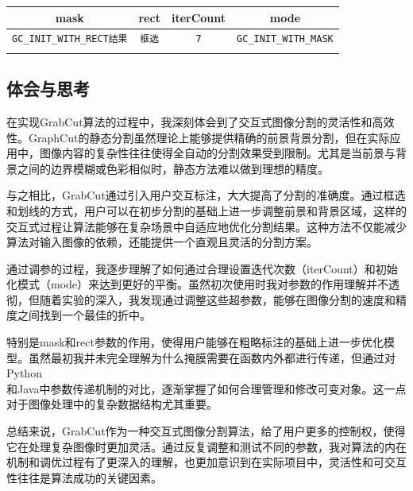 \documentclass[UTF8]{ctexart}
\begin{document}
\begin{table}[htbp]
\centering
\begin{tabular}{cccc}
\toprule[1.5pt]
\textbf{mask} & \textbf{rect} & \textbf{iterCount} & \textbf{mode}\\
\midrule
\verb|GC_INIT_WITH_RECT结果| & \verb|框选| & \verb|7| & \verb|GC_INIT_WITH_MASK|\\
\bottomrule[1.5pt]
\label{tab:params}
\end{tabular}
\end{table}

\subsection{体会与思考}
在实现GrabCut算法的过程中，我深刻体会到了交互式图像分割的灵活性和高效性。GraphCut的静态分割虽然理论上能够提供精确的前景背景分割，但在实际应用中，图像内容的复杂性往往使得全自动的分割效果受到限制。尤其是当前景与背景之间的边界模糊或色彩相似时，静态方法难以做到理想的精度。\par
与之相比，GrabCut通过引入用户交互标注，大大提高了分割的准确度。通过框选和划线的方式，用户可以在初步分割的基础上进一步调整前景和背景区域，这样的交互式过程让算法能够在复杂场景中自适应地优化分割结果。这种方法不仅能减少算法对输入图像的依赖，还能提供一个直观且灵活的分割方案。\par
通过调参的过程，我逐步理解了如何通过合理设置迭代次数（iterCount）和初始化模式（mode）来达到更好的平衡。虽然初次使用时我对参数的作用理解并不透彻，但随着实验的深入，我发现通过调整这些超参数，能够在图像分割的速度和精度之间找到一个最佳的折中。\par
特别是mask和rect参数的作用，使得用户能够在粗略标注的基础上进一步优化模型。虽然最初我并未完全理解为什么掩膜需要在函数内外都进行传递，但通过对Python\\和Java中参数传递机制的对比，逐渐掌握了如何合理管理和修改可变对象。这一点对于图像处理中的复杂数据结构尤其重要。\par
总结来说，GrabCut作为一种交互式图像分割算法，给了用户更多的控制权，使得它在处理复杂图像时更加灵活。通过反复调整和测试不同的参数，我对算法的内在机制和调优过程有了更深入的理解，也更加意识到在实际项目中，灵活性和可交互性往往是算法成功的关键因素。
\end{document}
